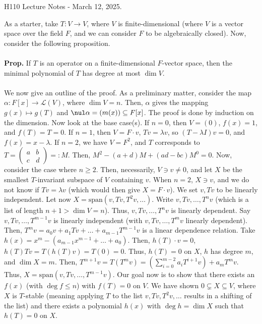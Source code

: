

\begin{center}
	H110 Lecture Notes - March 12, 2025. 
\end{center}

As a starter, take $T: V \to V$, where $V$ is finite-dimensional (where $V$ is a vector space over the field $F$, and we can consider $F$ to be algebraically closed). Now, consider the following proposition. 
\\
\\
\textbf{Prop. } If $T$ is an operator on a finite-dimensional $F$-vector space, then the minimal polynomial of $T$ has degree at most $\dim V$. 
\\
\\
We now give an outline of the proof. As a preliminary matter, consider the map $\alpha: F[x] \to \mathscr{L}(V)$, where $\dim V = n$. Then, $\alpha$ gives the mapping $g(x) \mapsto g(T)$ and $\nul \alpha = (m(x)) \subseteq F[x]$. The proof is done by induction on the dimension. Now look at the base case(s). If $n=0$, then $V = (0)$, $f(x)=1$, and $f(T) = T = 0$. If $n=1$, then $V=F \cdot v$, $Tv = \lambda v$, so $(T - \lambda I)v=0$, and $f(x)=x-\lambda$. If $n=2$, we have $V=F^2$, and $T$ corresponds to $T = \begin{pmatrix} a & b \\ c & d \end{pmatrix} =: M$. Then, $M^2 - (a+d)M + (ad-bc)M^0 = 0$. Now, consider the case where $n \geq 2$. Then, necessarily, $V \ni v \neq 0$, and let $X$ be the smallest $T$-invariant subspace of $V$ containing $v$. When $n=2$, $X \ni v$, and we do not know if $Tv = \lambda v$ (which would then give $X = F \cdot v$). We set $v, Tv$ to be linearly independent. Let now $X = \textrm{span}(v,Tv,T^2v,\dots)$. Write $v,Tv,\dots,T^nv$ (which is a list of length $n+1 > \dim V = n$). Thus, $v,Tv,\dots,T^nv$ is linearly dependent. Say $v,Tv,\dots,T^{m-1}v$ is linearly independent (with $v,Tv,\dots,T^mv$ linearly dependent). Then, $T^mv = a_0v + a_1Tv + \dots + a_{m-1}T^{m-1}v$ is a linear dependence relation. Take $h(x) = x^m - (a_{m-1}x^{m-1} + \dots + a_0)$. Then, $h(T) \cdot v = 0$, $h(T) Tv = T(h(T)v) = T(0) = 0$. Thus, $h(T)=0$ on $X$, $h$ has degree $m$, and $\dim X = m$. Then, $T^{m+1}v = T(T^{m}v) = \left(\sum_{i=0}^{m-2}a_iT^{i+1}v\right) + a_mT^mv$. Thus, $X = \textrm{span}(v,Tv,\dots,T^{m-1}v)$. Our goal now is to show that there exists an $f(x)$ (with $\deg f \leq n$) with $f(T)=0$ on $V$. We have shown $0 \subsetneq X \subseteq V$, where $X$ is $T$-stable (meaning applying $T$ to the list $v,Tv,T^2v,\dots$ results in a shifting of the list) and there exists a polynomial $h(x)$ with $\deg h = \dim X$ such that $h(T) = 0$ on $X$. 
